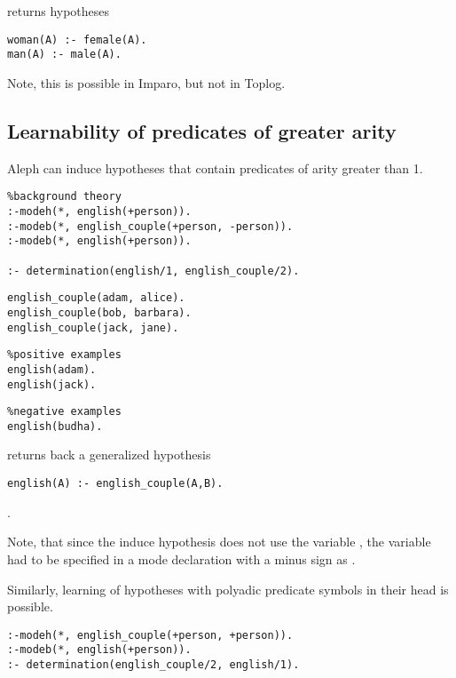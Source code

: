 returns hypotheses

\begin{lstlisting}
woman(A) :- female(A).
man(A) :- male(A).
\end{lstlisting}

Note, this is possible in Imparo, but not in Toplog.

\subsection{Learnability of predicates of greater arity}
Aleph can induce hypotheses that contain predicates of arity greater than 1.
\begin{lstlisting}
%background theory
:-modeh(*, english(+person)).
:-modeb(*, english_couple(+person, -person)).
:-modeb(*, english(+person)).

:- determination(english/1, english_couple/2).
\end{lstlisting}
\begin{minipage}[t]{.40\textwidth}
\begin{lstlisting}
english_couple(adam, alice).
english_couple(bob, barbara).
english_couple(jack, jane).
\end{lstlisting}
\end{minipage}
\begin{minipage}[t]{.27\textwidth}
\begin{lstlisting}
%positive examples
english(adam).
english(jack).
\end{lstlisting}
\end{minipage}
\begin{minipage}[t]{.25\textwidth}
\begin{lstlisting}
%negative examples
english(budha).
\end{lstlisting}
\end{minipage}

returns back a generalized hypothesis
\begin{lstlisting}
english(A) :- english_couple(A,B).
\end{lstlisting}.

Note, that since the induce hypothesis does not use the variable , the variable had to be specified in a mode declaration with a minus sign as .

Similarly, learning of hypotheses with polyadic predicate symbols in their head is possible.

\begin{lstlisting}
:-modeh(*, english_couple(+person, +person)).
:-modeb(*, english(+person)).
:- determination(english_couple/2, english/1).
\end{lstlisting}

